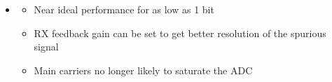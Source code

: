 \documentclass[25pt]{tikzposter} %
\newcommand{\hsct}[1]{{\Large\MakeUppercase{#1}}}
\begin{document}
\begin{columns}
{\begin{tikzfigure}[]
		\end{tikzfigure}
		\begin{itemize}
			\item[] {} %
			\begin{itemize}
				\item {Near ideal performance for as low as 1 bit}
				\item {RX feedback gain can be set to get better resolution of the spurious signal}
				\item {Main carriers no longer likely to saturate the ADC}								
			\end{itemize}
		\end{itemize}		
	}






\end{columns}
\end{document}
